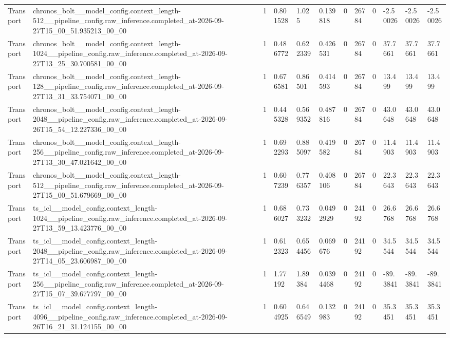 \begin{tabular}{llllllllllll}
Transport & chronos\_bolt\_\_model\_config.context\_length-512\_\_pipeline\_config.raw\_inference.completed\_at-2026-09-27T15\_00\_51.935213\_00\_00 & 1 & 0.801528 & 1.025 & 0.139818 & 0 & 26784 & 0 & -2.50026 & -2.50026 & -2.50026 \\
Transport & chronos\_bolt\_\_model\_config.context\_length-1024\_\_pipeline\_config.raw\_inference.completed\_at-2026-09-27T13\_25\_30.700581\_00\_00 & 1 & 0.486772 & 0.622339 & 0.426531 & 0 & 26784 & 0 & 37.7661 & 37.7661 & 37.7661 \\
Transport & chronos\_bolt\_\_model\_config.context\_length-128\_\_pipeline\_config.raw\_inference.completed\_at-2026-09-27T13\_31\_33.754071\_00\_00 & 1 & 0.676581 & 0.86501 & 0.414593 & 0 & 26784 & 0 & 13.499 & 13.499 & 13.499 \\
Transport & chronos\_bolt\_\_model\_config.context\_length-2048\_\_pipeline\_config.raw\_inference.completed\_at-2026-09-26T15\_54\_12.227336\_00\_00 & 1 & 0.445328 & 0.569352 & 0.487816 & 0 & 26784 & 0 & 43.0648 & 43.0648 & 43.0648 \\
Transport & chronos\_bolt\_\_model\_config.context\_length-256\_\_pipeline\_config.raw\_inference.completed\_at-2026-09-27T13\_30\_47.021642\_00\_00 & 1 & 0.692293 & 0.885097 & 0.419582 & 0 & 26784 & 0 & 11.4903 & 11.4903 & 11.4903 \\
Transport & chronos\_bolt\_\_model\_config.context\_length-512\_\_pipeline\_config.raw\_inference.completed\_at-2026-09-27T15\_00\_51.679669\_00\_00 & 1 & 0.607239 & 0.776357 & 0.408106 & 0 & 26784 & 0 & 22.3643 & 22.3643 & 22.3643 \\
Transport & ts\_icl\_\_model\_config.context\_length-1024\_\_pipeline\_config.raw\_inference.completed\_at-2026-09-27T13\_59\_13.423776\_00\_00 & 1 & 0.686027 & 0.733232 & 0.0492929 & 0 & 24192 & 0 & 26.6768 & 26.6768 & 26.6768 \\
Transport & ts\_icl\_\_model\_config.context\_length-2048\_\_pipeline\_config.raw\_inference.completed\_at-2026-09-27T14\_05\_23.606987\_00\_00 & 1 & 0.612323 & 0.654456 & 0.069676 & 0 & 24192 & 0 & 34.5544 & 34.5544 & 34.5544 \\
Transport & ts\_icl\_\_model\_config.context\_length-256\_\_pipeline\_config.raw\_inference.completed\_at-2026-09-27T15\_07\_39.677797\_00\_00 & 1 & 1.77192 & 1.89384 & 0.0394468 & 0 & 24192 & 0 & -89.3841 & -89.3841 & -89.3841 \\
Transport & ts\_icl\_\_model\_config.context\_length-4096\_\_pipeline\_config.raw\_inference.completed\_at-2026-09-26T16\_21\_31.124155\_00\_00 & 1 & 0.604925 & 0.646549 & 0.132983 & 0 & 24192 & 0 & 35.3451 & 35.3451 & 35.3451 \\

\end{tabular}
